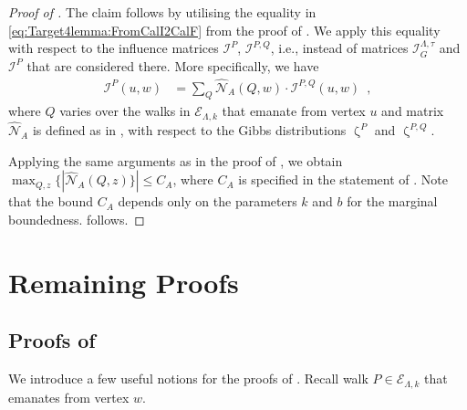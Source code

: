 \documentclass[11pt,reqno]{amsart}
\numberwithin{equation}{section}
\newcommand{\cE}{{\mathcal{E}}}
\newcommand{\cI}{{\mathcal{I}}}
\newcommand{\cN}{{\mathcal{N}}}
\newcommand{\amethyst}[1]{{\color{amethyst}#1} }
\newcommand{\blue}[1]{{\color{blue}#1}}
\newcommand{\bluepigment}[1]{{\color{blue(pigment)}#1}}
\newcommand{\cadmiumgreen}[1]{{\color{cadmiumgreen}#1}}
\newcommand{\cadmiumorange}[1]{{\color{cadmiumorange}#1}}
\newcommand{\goldenbrown}[1]{{\color{goldenbrown}#1}}
\newcommand{\magenta}[1]{{\color{magenta}#1}}
\newcommand{\iris}[1]{{\color{iris}#1}}
\newcommand{\red}[1]{{\color{red}#1}}
\newcommand{\ExtV}{\iris{\cE}}
\newcommand{\infmatrix}{\cI}
\newcommand{\spreadpoint}{\newpage}
\newcommand{\LastReviewG}[1]{{\color{magenta}\hspace{.2cm} [Rev: \textrm{#1} - \bluepigment{G} ] \hspace{.2cm}}}
\renewcommand{\LastReviewG}[1]{}
\renewcommand{\spreadpoint}{}
\renewcommand{\amethyst}[1]{#1}
\renewcommand{\blue}[1]{#1}
\renewcommand{\bluepigment}[1]{#1}
\renewcommand{\cadmiumgreen}[1]{#1}
\renewcommand{\cadmiumorange}[1]{#1}
\renewcommand{\goldenbrown}[1]{#1}
\renewcommand{\magenta}[1]{#1}
\renewcommand{\iris}[1]{#1}
\renewcommand{\red}[1]{#1}
\newcommand{\kk}{\bluepigment{k}}
\newcommand{\kP}{\goldenbrown{P}}
\newcommand{\kQ}{\amethyst{Q}}
\newcommand{\ku}{\red{u}}
\newcommand{\kw}{\blue{w}}
\newcommand{\kz}{\cadmiumgreen{z}}
\renewcommand{\kk}{k}
\renewcommand{\kP}{P}
\renewcommand{\kQ}{Q}
\renewcommand{\ku}{u}
\renewcommand{\kw}{w}
\renewcommand{\kz}{z}
\newcommand{\SymWeightM}{\cN}
\begin{document}
\begin{proof}[Proof of ]
The claim follows by utilising the equality in \eqref{eq:Target4lemma:FromCalI2CalF} from the proof of .
We apply this equality with respect to the influence matrices $\infmatrix^{\kP}$, $\infmatrix^{\kP,\kQ}$, i.e., instead of matrices $\infmatrix^{\Lambda,\tau}_G$ 
and $\infmatrix^{\kP}$ that are considered there. 
%
More specifically, we have 
%
\begin{align}\label{eq:Obs4lemma:FromCalF2CalH}
\infmatrix^{\kP}(\ku,\kw) &=\sum\nolimits_{\kQ} \widehat{\SymWeightM}_A(\kQ, \kw) \cdot \infmatrix^{\kP,\kQ}(\ku,\kw) \enspace,
\end{align}
where $\kQ$ varies over the walks in $\ExtV_{\Lambda,k}$ that emanate from vertex $\ku$ and matrix
 $\widehat{\SymWeightM}_A$ is defined as in , with respect to the Gibbs distributions
 $\upzeta^{\kP}$ and $\upzeta^{\kP,\kQ}$.
 

Applying the same arguments as in the proof of , 
we obtain  $\max_{\kQ,\kz}\{ |\widehat{\SymWeightM}_A(\kQ,\kz)\}| \leq C_A$, where $C_A$ is specified in 
the statement of . 
%
Note that the bound $C_A$  depends only on the parameters $\kk$ and $b$ for the
marginal boundedness. 
%
 follows. 
\end{proof}









\spreadpoint

\newcommand{\sawpaths}{\magenta{\Omega}}
\newcommand{\ABijection}{\cadmiumorange{\uph}}


\section{Remaining Proofs \LastReviewG{2025-03-11}}



 

\subsection{Proofs of }
\label{sec:lemma:TsawPVsTsaw}\label{sec:lemma:GibbsWeightsTpVsP}
We introduce a few useful notions  for the proofs of .
Recall   walk $\kP\in \ExtV_{\Lambda,\kk}$ that emanates from vertex $\kw$. 
\end{document}
